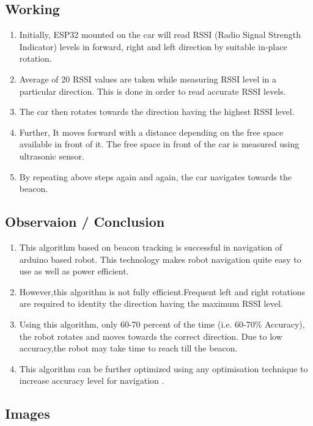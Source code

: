 \documentclass[journal,12pt,twocolumn]{IEEEtran}
\begin{document}
\subsection{\textbf{Working}}
\begin{enumerate}
    \item Initially, ESP32 mounted on the car will read RSSI (Radio Signal Strength Indicator) levels in forward, right and left direction by suitable in-place rotation.
    \item Average of 20 RSSI values are taken while measuring RSSI level in a particular direction. This is done in order to read accurate RSSI levels.
    \item The car then rotates towards the direction having the highest RSSI level.
    \item Further, It moves forward with a distance depending on the free space available in front of it. The free space in front of the car is measured using ultrasonic sensor.
    \item By repeating above steps again and again, the car navigates towards the beacon.
\end{enumerate}
\subsection{\textbf{Observaion / Conclusion}}
\begin{enumerate}
    \item This algorithm based on beacon tracking is successful in navigation of arduino based robot. This technology makes robot navigation quite easy to use as well as power efficient.
    \item However,this algorithm is not fully efficient.Frequent left and right rotations are required to identity the direction having the maximum RSSI level.
    \item Using this algorithm, only 60-70 percent of the time (i.e. 60-70\% Accuracy), the robot rotates and moves towards the correct direction. Due to low accuracy,the robot may take time to reach till the beacon. 
    \item This algorithm can be further optimized using any optimisation technique to increase accuracy level for navigation .
\end{enumerate}

\newpage
\subsection{\textbf{Images}}
\end{document}

